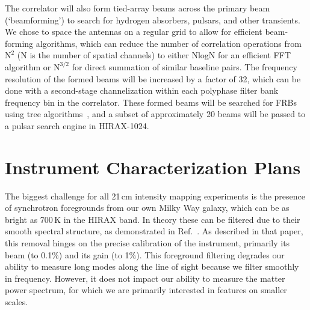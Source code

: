 \documentclass[]{spie}  %
\begin{document}
The correlator will also form tied-array beams across the primary beam (`beamforming') to search for hydrogen absorbers, pulsars, and other transients. We chose to space the antennas on a regular grid to allow for efficient beam-forming algorithms, which can reduce the number of correlation operations from $\mathrm{N}^{2}$ (N is the number of spatial channels) to either NlogN for an efficient FFT algorithm or $\mathrm{N}^{3/2}$ for direct summation of similar baseline pairs.  The frequency resolution of the formed beams will be increased by a factor of 32, which can be done with a second-stage channelization within each polyphase filter bank frequency bin in the correlator. These formed beams will be searched for FRBs using tree algorithms~\cite{2015Natur.528..523M}, and a subset of approximately 20 beams will be passed to a pulsar search engine in HIRAX-1024.


\section{Instrument Characterization Plans}
\label{sec:chall}

The biggest challenge for all 21\,cm intensity mapping experiments is the presence of synchrotron foregrounds from our own Milky Way galaxy, which can be as bright as 700\,K in the HIRAX band. In theory these can be filtered due to their smooth spectral structure, as demonstrated in Ref.~\cite{2015PhRvD..91h3514S}. As described in that paper, this removal hinges on the precise calibration of the instrument, primarily its beam (to 0.1\%) and its gain (to 1\%). This foreground filtering degrades our ability to measure long modes along the line of sight because we filter smoothly in frequency. However, it does not impact our ability to measure the matter power spectrum, for which we are primarily interested in features on smaller scales. \newline
\end{document}
